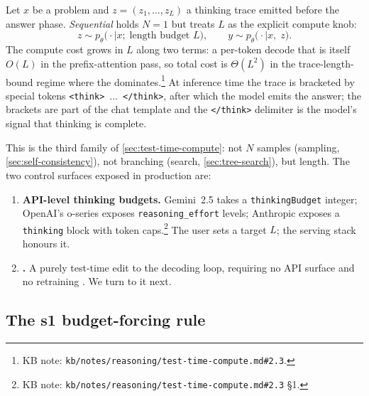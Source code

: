 Let $x$ be a problem and $z = (z_1, \ldots, z_L)$ a thinking trace
emitted before the answer phase. \emph{Sequential} 
holds $N = 1$ but treats $L$ as the explicit compute knob:
\begin{equation}
  z \sim p_\theta\bigl(\cdot \mid x;\; \text{length budget } L\bigr),
  \qquad
  y \sim p_\theta\bigl(\cdot \mid x,\; z\bigr).
  \label{eq:sequential-ttc}
\end{equation}
The compute cost grows in $L$ along two terms: a per-token decode that
is itself $O(L)$ in the prefix-attention pass, so total cost is
$\Theta(L^2)$ in the trace-length-bound regime where the 
dominates.\footnote{KB note:
\texttt{kb/notes/reasoning/test-time-compute.md\#2.3}.} At inference
time the trace is bracketed by special tokens
\texttt{<think>}~$\ldots$~\texttt{</think>}, after which the model
emits the answer; the brackets are part of the chat template and the
\texttt{</think>} delimiter is the model's signal that thinking is
complete.

This is the third  family of \cref{sec:test-time-compute}: not
$N$ samples (sampling, \cref{sec:self-consistency}), not branching
(search, \cref{sec:tree-search}), but length. The two control surfaces
exposed in production are:
\begin{enumerate}
  \item \textbf{API-level thinking budgets.} Gemini~2.5 takes a
        \texttt{thinkingBudget} integer; OpenAI's o-series exposes
        \texttt{reasoning\_effort} levels; Anthropic exposes a
        \texttt{thinking} block with token caps.\footnote{KB note:
        \texttt{kb/notes/reasoning/test-time-compute.md\#2.3} §1.}
        The user sets a target $L$; the serving stack honours it.
  \item \textbf{.} A purely test-time edit to the
        decoding loop, requiring no API surface and no retraining
        \citep[\S 3.1]{s1-2025}. We turn to it next.
\end{enumerate}

\subsection{The s1 budget-forcing rule}
\label{sec:s1-rule}

